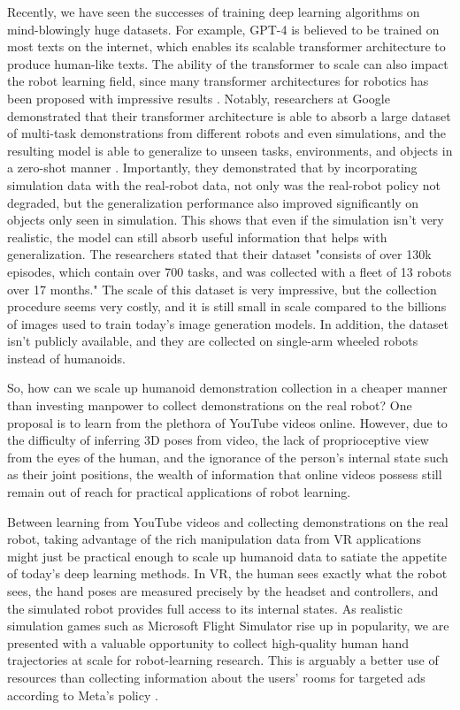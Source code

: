 Recently, we have seen the successes of training deep learning algorithms on mind-blowingly huge datasets. For example, GPT-4 \cite{openai2023gpt4} is believed to be trained on most texts on the internet, which enables its scalable transformer architecture to produce human-like texts. The ability of the transformer to scale can also impact the robot learning field, since many transformer architectures for robotics has been proposed with impressive results \cite{zhu2023viola} \cite{jiang2022vima}. Notably, researchers at Google demonstrated that their transformer architecture is able to absorb a large dataset of multi-task demonstrations from different robots and even simulations, and the resulting model is able to generalize to unseen tasks, environments, and objects in a zero-shot manner \cite{brohan2022rt1}. Importantly, they demonstrated that by incorporating simulation data with the real-robot data, not only was the real-robot policy not degraded, but the generalization performance also improved significantly on objects only seen in simulation. This shows that even if the simulation isn't very realistic, the model can still absorb useful information that helps with generalization. The researchers stated that their dataset "consists of over 130k episodes, which contain over 700 tasks, and was collected with a fleet of 13 robots over 17 months." The scale of this dataset is very impressive, but the collection procedure seems very costly, and it is still small in scale compared to the billions of images used to train today's image generation models. In addition, the dataset isn't publicly available, and they are collected on single-arm wheeled robots instead of humanoids. 

So, how can we scale up humanoid demonstration collection in a cheaper manner than investing manpower to collect demonstrations on the real robot? 
One proposal is to learn from the plethora of YouTube videos online. However, due to the difficulty of inferring 3D poses from video, the lack of proprioceptive view from the eyes of the human, and the ignorance of the person's internal state such as their joint positions, the wealth of information that online videos possess still remain out of reach for practical applications of robot learning. 

Between learning from YouTube videos and collecting demonstrations on the real robot, taking advantage of the rich manipulation data from VR applications might just be practical enough to scale up humanoid data to satiate the appetite of today's deep learning methods. In VR, the human sees exactly what the robot sees, the hand poses are measured precisely by the headset and controllers, and the simulated robot provides full access to its internal states. As realistic simulation games such as Microsoft Flight Simulator rise up in popularity, we are presented with a valuable opportunity to collect high-quality human hand trajectories at scale for robot-learning research. This is arguably a better use of resources than collecting information about the users' rooms for targeted ads according to Meta's policy \cite{oculus-privacy}.

